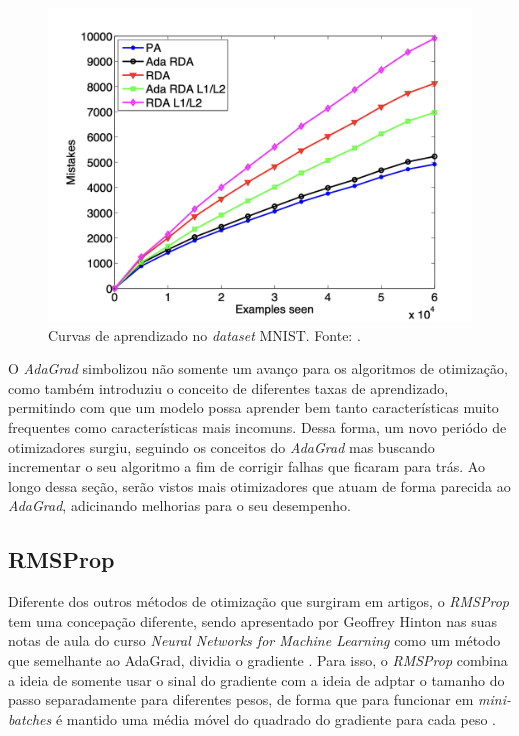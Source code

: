 \begin{figure}[h]
    \centering
    \includegraphics[width=0.65\linewidth]{../imagens/retropropagacao-gradiente/comparativo-adagrad-mnist.png}
    
    \caption[Curvas de aprendizado no MNIST]{%
        Curvas de aprendizado no \textit{dataset} MNIST.
        \newline %
        \small Fonte: \parencite{AdaGradMethod}.
    }
    \label{fig:curvas-de-aprendizado-adagrad-mnist}
\end{figure}

O \textit{AdaGrad} simbolizou não somente um avanço para os algoritmos de otimização, como também introduziu o conceito de diferentes taxas de aprendizado, permitindo com que um modelo possa aprender bem tanto características muito frequentes como características mais incomuns. Dessa forma, um novo periódo de otimizadores surgiu, seguindo os conceitos do \textit{AdaGrad} mas buscando incrementar o seu algoritmo a fim de corrigir falhas que ficaram para trás. Ao longo dessa seção, serão vistos mais otimizadores que atuam de forma parecida ao \textit{AdaGrad}, adicinando melhorias para o seu desempenho.

\subsection{RMSProp}

Diferente dos outros métodos de otimização que surgiram em artigos, o \textit{RMSProp} tem uma concepação diferente, sendo apresentado por Geoffrey Hinton nas suas notas de aula do curso \textit{Neural Networks for Machine Learning} como um método que semelhante ao AdaGrad, dividia o gradiente \parencite{RMSPropMethod}. Para isso, o \textit{RMSProp} combina a ideia de somente usar o sinal do gradiente com a ideia de adptar o tamanho do passo separadamente para diferentes pesos, de forma que para funcionar em \textit{mini-batches} é mantido uma média móvel do quadrado do gradiente para cada peso \parencite{RMSPropMethod}.

